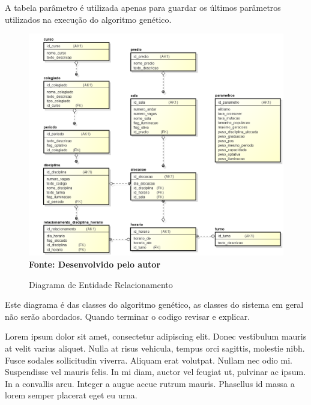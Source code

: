 \documentclass{abntpuc}
\begin{document}
A tabela parâmetro é utilizada apenas para guardar os últimos parâmetros utilizados na execução do algoritmo genético.\par

\begin{figure}[!htb]
\caption[Diagrama de Entidade Relacionamento]{Diagrama de Entidade Relacionamento}
\label{fig:figura2}
\centering
\includegraphics[scale=0.5]{imagens/diagramaEntidadeRelacionamento.png}
\\ \textbf{\footnotesize Fonte: Desenvolvido pelo autor}
\end{figure}


Este diagrama é das classes do algoritmo genético, as classes do sistema em geral não serão abordados. Quando terminar o codigo revisar e explicar.\par
Lorem ipsum dolor sit amet, consectetur adipiscing elit. Donec vestibulum mauris at velit varius aliquet. Nulla at risus vehicula, tempus orci sagittis, molestie nibh. Fusce sodales sollicitudin viverra. Aliquam erat volutpat. Nullam nec odio mi. Suspendisse vel mauris felis. In mi diam, auctor vel feugiat ut, pulvinar ac ipsum. In a convallis arcu. Integer a augue accue rutrum mauris. Phasellus id massa a lorem semper placerat eget eu urna.\par
\end{document}
